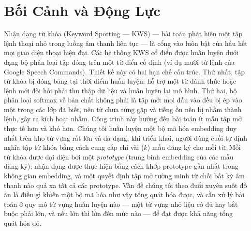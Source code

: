 \documentclass[12pt,a4paper]{report}
\begin{document}
\section{Bối Cảnh và Động Lực}\label{sec:context}

Nhận dạng từ khóa (Keyword Spotting --- KWS) --- bài toán phát hiện một tập lệnh
thoại nhỏ trong luồng âm thanh liên tục --- là cổng vào luôn bật của hầu hết mọi
giao diện thoại hiện đại. Các hệ thống KWS cổ điển được huấn luyện dưới dạng bộ
phân loại tập đóng trên một từ điển cố định (ví dụ mười từ lệnh của Google Speech
Commands). Thiết kế này có hai hạn chế cấu trúc. Thứ nhất, tập từ khóa bị đóng
băng tại thời điểm huấn luyện: hỗ trợ một từ đánh thức hoặc lệnh mới đòi hỏi
phải thu thập dữ liệu và huấn luyện lại mô hình. Thứ hai, bộ phân loại softmax
về bản chất không phải là tập mở: mọi đầu vào đều bị ép vào một trong các lớp đã
biết, nên từ chưa từng gặp và tiếng ồn nền bị nhầm thành lệnh, gây ra kích hoạt
nhầm. Công trình này hướng đến bài toán ít mẫu tập mở thực tế hơn và khó hơn. Chúng tôi huấn luyện một bộ mã hóa embedding duy nhất
trên kho từ vựng rất lớn và đa dạng; khi triển khai, người dùng cuối tự định
nghĩa tập từ khóa bằng cách cung cấp chỉ vài ($k$) mẫu đăng ký cho mỗi
từ. Mỗi từ khóa được đại diện bởi một \emph{prototype} (trung bình embedding của
các mẫu đăng ký); nhận dạng được thực hiện bằng cách khớp prototype gần nhất
trong không gian embedding, và một quyết định tập mở tường minh từ chối bất kỳ
âm thanh nào quá xa tất cả các prototype. Vấn đề chúng tôi theo đuổi xuyên suốt
đồ án là điều gì khiến một bộ mã hóa như vậy tổng quát hóa được, và cần xử lý
bài toán ở quy mô từ vựng huấn luyện nào --- một từ vựng nhỏ liệu
có đủ hay bắt buộc phải lớn, và nếu lớn thì lớn đến mức nào --- để đạt được khả
năng tổng quát hóa đó.
\end{document}
